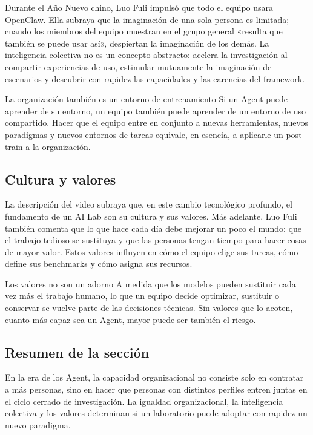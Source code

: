 \documentclass[a4paper]{article}
\begin{document}
Durante el Año Nuevo chino, Luo Fuli impulsó que todo el equipo usara OpenClaw. Ella subraya que la imaginación de una sola persona es limitada; cuando los miembros del equipo muestran en el grupo general «resulta que también se puede usar así», despiertan la imaginación de los demás. La inteligencia colectiva no es un concepto abstracto: acelera la investigación al compartir experiencias de uso, estimular mutuamente la imaginación de escenarios y descubrir con rapidez las capacidades y las carencias del framework.

\begin{importantbox}{La organización también es un entorno de entrenamiento}
Si un Agent puede aprender de su entorno, un equipo también puede aprender de un entorno de uso compartido. Hacer que el equipo entre en conjunto a nuevas herramientas, nuevos paradigmas y nuevos entornos de tareas equivale, en esencia, a aplicarle un post-train a la organización.
\end{importantbox}

\subsection{Cultura y valores}

La descripción del video subraya que, en este cambio tecnológico profundo, el fundamento de un AI Lab son su cultura y sus valores. Más adelante, Luo Fuli también comenta que lo que hace cada día debe mejorar un poco el mundo: que el trabajo tedioso se sustituya y que las personas tengan tiempo para hacer cosas de mayor valor. Estos valores influyen en cómo el equipo elige sus tareas, cómo define sus benchmarks y cómo asigna sus recursos.

\begin{warningbox}{Los valores no son un adorno}
A medida que los modelos pueden sustituir cada vez más el trabajo humano, lo que un equipo decide optimizar, sustituir o conservar se vuelve parte de las decisiones técnicas. Sin valores que lo acoten, cuanto más capaz sea un Agent, mayor puede ser también el riesgo.
\end{warningbox}

\subsection{Resumen de la sección}

En la era de los Agent, la capacidad organizacional no consiste solo en contratar a más personas, sino en hacer que personas con distintos perfiles entren juntas en el ciclo cerrado de investigación. La igualdad organizacional, la inteligencia colectiva y los valores determinan si un laboratorio puede adoptar con rapidez un nuevo paradigma.
\end{document}
